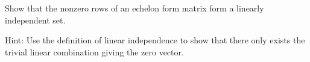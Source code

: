 
\begin{Exercise}[
name={},
title={}, 
difficulty=0,
origin={\cite{JH}}]
    Show that the nonzero rows of an echelon form matrix form a linearly
    independent set.
\end{Exercise}

\begin{Answer}
Hint: Use the definition of linear independence to show that there only exists the trivial linear combination giving the zero vector.
\end{Answer}
